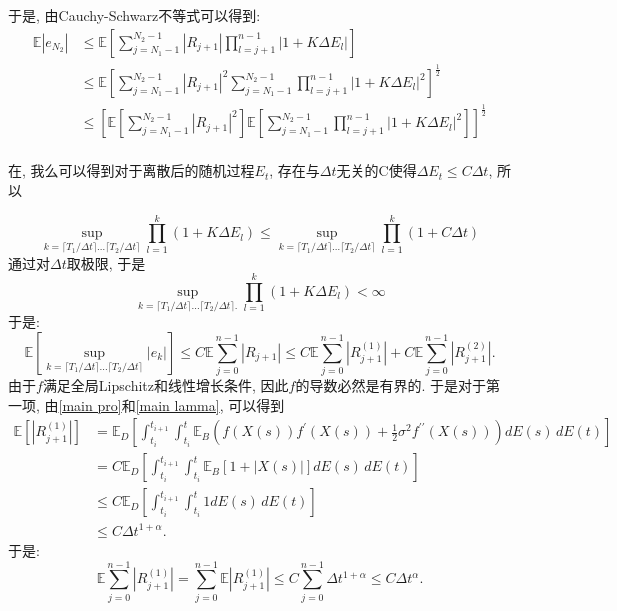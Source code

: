 \documentclass[12pt, final]{article}
\makeatletter
\numberwithin{equation}{section}
\numberwithin{figure}{section}
\numberwithin{table}{section}
\theoremstyle{plain}
\renewcommand{\proofname}{证明}
\theoremstyle{Definition}
\theoremstyle{Remark}
\renewenvironment{proof}[1][\proofname]{\par
	\pushQED{\qed}%
	\normalfont \topsep6\p@\@plus6\p@\relax
	\trivlist\item[\hskip\labelsep
	\bfseries #1\@addpunct{\, :\, }]\ignorespaces
}{%
	\popQED\endtrivlist\@endpefalse
}
\makeatother
\begin{document}
\begin{proof}
		于是, 由Cauchy-Schwarz不等式可以得到: 
		\begin{align*}
			\mathbb{E}|e_{N_2}| &\leq \mathbb{E}\left[\sum\limits_{j=N_1-1}^{N_2-1}|R_{j+1}|\prod\limits_{l=j+1}^{n-1}|1+K\Delta E_l|\right]\\ 
			& \le  \mathbb{E}\left[\sum\limits_{j=N_1-1}^{N_2-1}|R_{j+1}|^2
			\sum\limits_{j=N_1-1}^{N_2-1}\prod\limits_{l=j+1}^{n-1}|1+K\Delta E_l|^2\right]^{\frac{1}{2}} \\
			& \le \left[\mathbb{E} \left[\sum\limits_{j=N_1-1}^{N_2-1}|R_{j+1}|^2\right]
			\mathbb{E} \left[\sum\limits_{j=N_1-1}^{N_2-1}\prod\limits_{l=j+1}^{n-1}|1+K\Delta E_l|^2\right]\right]^{\frac{1}{2}} \\
		\end{align*}
		
		
		在\cite{li2023convergence}, 我么可以得到对于离散后的随机过程$E_t$, 存在与$\Delta t$无关的C使得$\Delta E_t \le C \Delta t$, 所以
		
		\begin{equation*}
			\sup\limits_{k=\lceil T_1/\Delta t \rceil \ldots \lceil T_2/\Delta t \rceil} \prod\limits_{l=1}^{k}(1+K\Delta E_l) \le \sup\limits_{k=\lceil T_1/\Delta t \rceil \ldots \lceil T_2/\Delta t \rceil} \prod\limits_{l=1}^{k}(1+C\Delta t)
		\end{equation*}
		通过对$\Delta t$取极限, 
		于是
		\begin{equation*}
			\sup\limits_{k=\lceil T_1/\Delta t \rceil \ldots \lceil T_2/\Delta t \rceil. } \prod\limits_{l=1}^{k}(1+K\Delta E_l) < \infty
		\end{equation*}
		于是:
		\begin{equation}
			\mathbb{E}\left[\sup\limits_{k=\lceil T_1/\Delta t \rceil \ldots \lceil T_2/\Delta t \rceil}\left|e_k\right|\right] \leq C\mathbb{E}\sum_{j=0}^{n-1}|R_{j+1}| \leq C\mathbb{E}\sum\limits_{j=0}^{n-1}|R_{j+1}^{(1)}| + C\mathbb{E}\sum\limits_{j=0}^{n-1}|R_{j+1}^{(2)}|. 
		\end{equation}
		由于$f$满足全局Lipschitz和线性增长条件, 因此$f$的导数必然是有界的. 
		于是对于第一项,  由\cref{main pro}和\cref{main lamma}, 可以得到
		\begin{align*}
			\mathbb{E} \left[|R_{j+1}^{(1)}| \right] &= \mathbb{E}_D \left[
			  \int_{t_i}^{t_{i+1}} \int_{t_i}^{t}  \mathbb{E}_B \left( f(X(s)) f^{\prime}(X(s)) + \frac{1}{2} \sigma^2 f^{\prime\prime}(X(s)) \right) dE(s) \, dE(t)
			 \right] \\
			 &= C\mathbb{E}_D \left[
			 \int_{t_i}^{t_{i+1}} \int_{t_i}^{t}  \mathbb{E}_B \left[1+|X(s)| \right] dE(s) \, dE(t)
			 \right] \\
			 & \le C\mathbb{E}_D \left[
			 \int_{t_i}^{t_{i+1}} \int_{t_i}^{t}  1 dE(s) \, dE(t)
			 \right] \\
			 &\le C\Delta t^{1+\alpha}. 
		\end{align*}
		于是:
		\begin{equation}
			\mathbb{E}\sum\limits_{j=0}^{n-1}|R_{j+1}^{(1)}|= \sum\limits_{j=0}^{n-1}\mathbb{E}|R_{j+1}^{(1)}| \leq
			C\sum\limits_{j=0}^{n-1}\Delta t^{1+\alpha} \le C\Delta t^\alpha. 
		\end{equation}


\end{proof}
\end{document}
